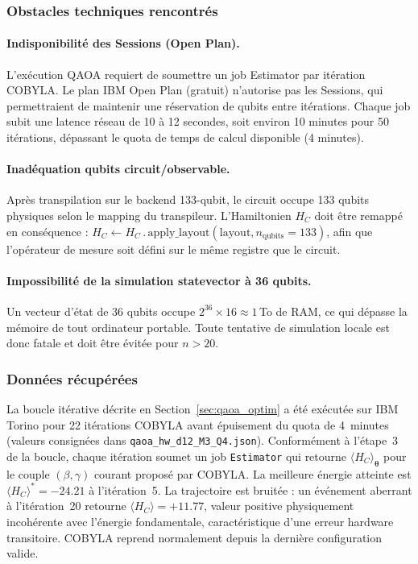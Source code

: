 \documentclass[12pt,a4paper]{article}
\begin{document}
\subsubsection{Obstacles techniques rencontrés}

\paragraph{Indisponibilité des Sessions (Open Plan).}
L'exécution QAOA requiert de soumettre un job Estimator par itération COBYLA.
Le plan IBM Open Plan (gratuit) n'autorise pas les Sessions, qui permettraient
de maintenir une réservation de qubits entre itérations.
Chaque job subit une latence réseau de 10 à 12 secondes, soit environ
10 minutes pour 50 itérations, dépassant le quota de temps de calcul
disponible (4 minutes).

\paragraph{Inadéquation qubits circuit/observable.}
Après transpilation sur le backend 133-qubit, le circuit occupe 133 qubits
physiques selon le mapping du transpileur.
L'Hamiltonien $H_C$ doit être remappé en conséquence :
$H_C \leftarrow H_C\,.\,\mathrm{apply\_layout}(\mathrm{layout}, n_{\mathrm{qubits}}=133)$,
afin que l'opérateur de mesure soit défini sur le même registre que le circuit.

\paragraph{Impossibilité de la simulation statevector à 36 qubits.}
Un vecteur d'état de 36 qubits occupe $2^{36} \times 16 \approx 1$\,To de RAM,
ce qui dépasse la mémoire de tout ordinateur portable.
Toute tentative de simulation locale est donc fatale et doit être évitée
pour $n > 20$.

\subsubsection{Données récupérées}

La boucle itérative décrite en Section~\ref{sec:qaoa_optim} a été exécutée
sur IBM Torino pour 22 itérations COBYLA avant épuisement du quota de 4~minutes
(valeurs consignées dans \texttt{qaoa\_hw\_d12\_M3\_Q4.json}).
Conformément à l'étape~3 de la boucle, chaque itération soumet un job
\texttt{Estimator} qui retourne $\langle H_C\rangle_{\bm{\theta}}$ pour le
couple $(\beta, \gamma)$ courant proposé par COBYLA.
La meilleure énergie atteinte est $\langle H_C\rangle^* = -24.21$
à l'itération~5.
La trajectoire est bruitée : un événement aberrant à l'itération~20
retourne $\langle H_C\rangle = +11.77$, valeur positive physiquement
incohérente avec l'énergie fondamentale, caractéristique d'une erreur hardware
transitoire.
COBYLA reprend normalement depuis la dernière configuration valide.
\end{document}
